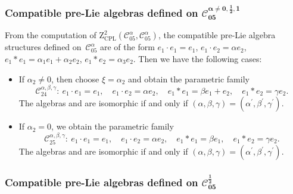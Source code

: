 \documentclass[pdftex]{sigma}
\numberwithin{equation}{section}
\begin{document}
\subsubsection[Compatible pre-Lie algebras defined on C\_\{05\}\^{}\{alpha not = 0,1/2,1\}]{Compatible pre-Lie algebras defined on $\boldsymbol{\mathcal{C}_{05}^{\alpha \not= 0,\frac{1}{2},1}}$}

From the computation of $\mathrm{Z}_{\mathrm{CPL}}^{2}(\mathcal{C}%
_{05}^{\alpha },\mathcal{C}_{05}^{\alpha })$, the compatible pre-Lie algebra
structures defined on~$\mathcal{C}_{05}^{\alpha }$ are of the form
$e_{1}\cdot e_{1}=e_{1}$, $e_{1}\cdot e_{2}=\alpha e_{2}$, $e_{1}\ast e_{1}=\alpha _{1}e_{1}+\alpha _{2}e_{2}$, $e_{1}\ast
e_{2}=\alpha _{3}e_{2}$.
Then we have the following cases:
\begin{itemize}\itemsep=0pt
\item If $\alpha _{2}\neq 0$, then choose $\xi =\alpha _{2}$ and
obtain the parametric family
\[
\mathcal{C}_{24}^{\alpha ,\beta ,\gamma }\colon \
e_{1}\cdot e_{1}=e_{1}, \quad e_{1}\cdot e_{2}=\alpha e_{2}, \quad
e_{1}\ast e_{1}=\beta e_{1}+e_{2}, \quad e_{1}\ast e_{2}=\gamma e_{2}.
\]
The algebras  and \smash{$\mathcal{C}%
_{24}^{\alpha ^{\prime }\beta ^{\prime },\gamma ^{\prime }}$} are isomorphic
if and only if $(\alpha, \beta, \gamma)=(\alpha ^{\prime },\beta ^{\prime },
\gamma ^{\prime })$.

\item If $\alpha _{2}=0$, we obtain the parametric family
\[
\mathcal{C}_{25}^{\alpha ,\beta ,\gamma } \colon \
e_{1}\cdot e_{1}=e_{1}, \quad e_{1}\cdot e_{2}=\alpha e_{2}, \quad
e_{1}\ast e_{1}=\beta e_{1}, \quad e_{1}\ast e_{2}=\gamma e_{2}.
\]
The algebras \smash{$\mathcal{C}_{25}^{\alpha ,\beta ,\gamma }$} and  are isomorphic
if and only if $(\alpha, \beta, \gamma)=(\alpha ^{\prime },\beta ^{\prime },
\gamma ^{\prime })$.
\end{itemize}

\subsubsection[Compatible pre-Lie algebras defined on C\_\{05\}\^{}\{1/2\}]{Compatible pre-Lie algebras defined on $\boldsymbol{\mathcal{C}_{05}^{\frac{1}{2}}}$}
\end{document}
